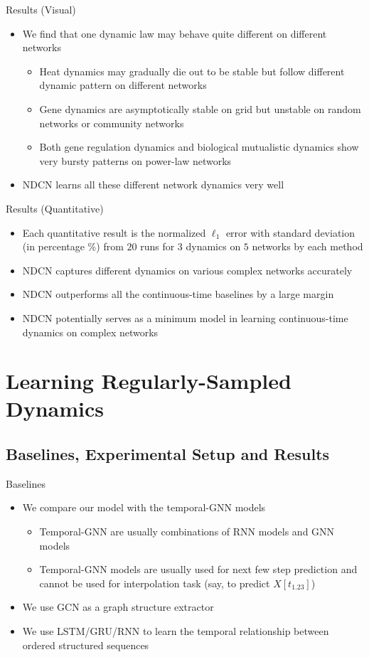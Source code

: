 \documentclass{beamer}
\begin{document}
\begin{frame}{Results (Visual)}
\begin{itemize}
\item We find that one dynamic law may behave quite different on different networks
\begin{itemize}
\item Heat dynamics may gradually die out to be stable but follow different dynamic pattern on different networks
\item Gene dynamics are asymptotically stable on grid but unstable on random networks or community networks
\item Both gene regulation dynamics and biological mutualistic dynamics show very bursty patterns on power-law networks
\end{itemize}
\item NDCN learns all these different network dynamics very well
\end{itemize}
\end{frame}

\begin{frame}{Results (Quantitative)}
\begin{itemize}
\item Each quantitative result is the normalized $\ell_1$ error with standard deviation (in percentage \%) from $20$ runs for $3$ dynamics on $5$ networks by each method
\item NDCN captures different dynamics on various complex networks accurately
\item NDCN outperforms all the continuous-time baselines by a large margin
\item NDCN potentially serves as a minimum model in learning continuous-time dynamics on complex networks
\end{itemize}
\end{frame}

\section{Learning Regularly-Sampled Dynamics}
\subsection{Baselines, Experimental Setup and Results}
\begin{frame}{Baselines}
\begin{itemize}
\item We compare our model with the temporal-GNN models
\begin{itemize}
\item Temporal-GNN are usually combinations of RNN models and GNN models
\item Temporal-GNN models are usually used for next few step prediction and cannot be used for interpolation task (say, to predict $X[t_{1.23}]$)
\end{itemize}
\item We use GCN as a graph structure extractor
\item We use LSTM/GRU/RNN to learn the temporal relationship between ordered structured sequences
\end{itemize}
\end{frame}
\end{document}
